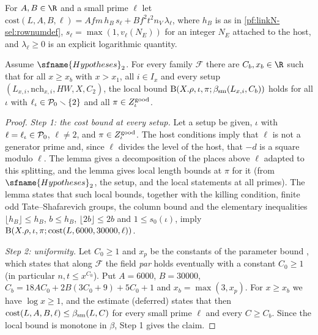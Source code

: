 For $A,B\in\R$ and a small prime $\ell$ let $\mathrm{cost}(L,A,B,\ell)=Afm\,h_B\,s_\ell+Bf^2t^2n_V\,\lambda_\ell$, where $h_B$ is as in
\cref{pf:linkN-sel:rownumdef}, $s_\ell=\max(1,v_\ell(N_E))$ for an integer $N_E$ attached to the host, and $\lambda_\ell\ge0$ is an
explicit logarithmic quantity.

\begin{lemma}\label{pf:linkN-sel:starS}
Assume $\sfname{Hypotheses}_2$. For every family $\mathcal F$ there are $C_b,x_b\in\R$ such that for all $x\ge x_b$ with $x>x_1$, all
$i\in I_x$ and every setup $(L_{x,i},\mathrm{nch}_{x,i},HW,X,C_2)$, the local bound $\mathrm{B}(X.\rho,\iota,\pi;\beta_{\mathrm{sm}}(L_{x,i},C_b))$
holds for all $\iota$ with $\ell_\iota\in\mathcal P_0\smallsetminus\{2\}$ and all $\pi\in Z^{\mathrm{good}}_\iota$.
\end{lemma}

\begin{proof}
\emph{Step 1: the cost bound at every setup.} Let a setup be given, $\iota$ with $\ell=\ell_\iota\in\mathcal P_0$, $\ell\ne2$, and
$\pi\in Z^{\mathrm{good}}_\iota$. The host conditions imply that $\ell$ is not a generator prime and, since $\ell$ divides the level of the
host, that $-d$ is a square modulo $\ell$. The lemma  gives a decomposition of the places
above $\ell$ adapted to this splitting, and the lemma  gives local length bounds at
$\pi$ for it (from $\sfname{Hypotheses}_2$, the setup, and the local statements  at all primes). The
lemma  states that such local bounds, together with the
killing condition, finite odd Tate--Shafarevich groups, the column bound  and the elementary inequalities
$\lfloor h_B\rfloor\le h_B$, $b\le h_B$, $\lfloor2b\rfloor\le2b$ and $1\le s_0(\iota)$, imply
$\mathrm{B}(X.\rho,\iota,\pi;\mathrm{cost}(L,6000,30000,\ell))$.

\emph{Step 2: uniformity.} Let $C_0\ge1$ and $x_p$ be the constants of the parameter bound
, which states that along $\mathcal F$ the field \emph{par} holds
eventually with a constant $C_0\ge1$ (in particular $n,t\le x^{C_0}$). Put $A=6000$, $B=30000$, $C_b=18AC_0+2B(3C_0+9)+5C_0+1$ and
$x_b=\max(3,x_p)$. For $x\ge x_b$ we have $\log x\ge1$, and the estimate  (deferred) states that
then $\mathrm{cost}(L,A,B,\ell)\le\beta_{\mathrm{sm}}(L,C)$ for every small prime $\ell$ and every $C\ge C_b$. Since the local bound is monotone
in $\beta$, Step 1 gives the claim.
\end{proof}

